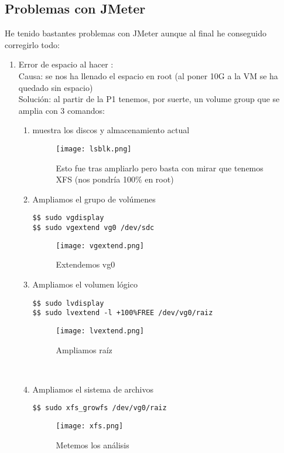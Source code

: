 \subsection{Problemas con JMeter}
He tenido bastantes problemas con JMeter aunque al final he conseguido corregirlo todo:
\begin{enumerate}
	\item Error de espacio al hacer :\\
	Causa: se nos ha llenado el espacio en root (al poner 10G a la VM se ha quedado sin espacio)\\
	Solución: al partir de la P1 tenemos, por suerte, un volume group que se amplia con 3 comandos:
	\begin{enumerate}
		\item {} muestra los discos y almacenamiento actual
		\begin{figure}[H]
			\centering
			\texttt{[image: lsblk.png]}
			\caption{Esto fue tras ampliarlo pero basta con mirar que tenemos XFS (nos pondría 100\% en root)}
		\end{figure}
	
		\item Ampliamos el grupo de volúmenes \begin{verbatim}
$$ sudo vgdisplay
$$ sudo vgextend vg0 /dev/sdc
		\end{verbatim}
		\begin{figure}[H]
			\centering
			\texttt{[image: vgextend.png]}
			\caption{Extendemos vg0}
		\end{figure}

		\item Ampliamos el volumen lógico
		\begin{verbatim}
$$ sudo lvdisplay
$$ sudo lvextend -l +100%FREE /dev/vg0/raiz
		\end{verbatim}
\begin{figure}[H]
	\texttt{[image: lvextend.png]}
	\caption{Ampliamos raíz}
\end{figure}
\quad\\
		\item Ampliamos el sistema de archivos
		\begin{verbatim}
$$ sudo xfs_growfs /dev/vg0/raiz
		\end{verbatim}
\begin{figure}[H]
	\centering
	\texttt{[image: xfs.png]}
	\caption{Metemos los análisis}
\end{figure}
	\end{enumerate}


\end{enumerate}
